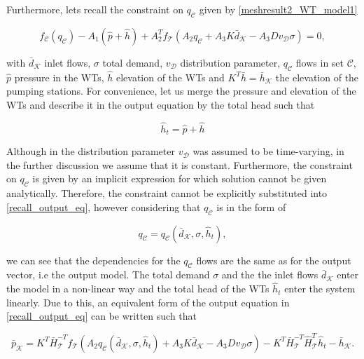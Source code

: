 Furthermore, lets recall the constraint on $q_\mathcal{C}$ given by \eqref{meshresult2_WT_model1}

 \begin{equation}
\label{recall_constraint eq}
f_{\mathcal{C}}(q_\mathcal{C}) - A_1(\hat{p} + \hat{h}) + A_2^T f_{\mathcal{T}}(A_2 q_\mathcal{C} + A_3 K \bar{d}_{\mathcal{K}} - A_3 D v_{\mathcal{D}} \sigma) = 0,
\end{equation} 

with $\bar{d}_{\mathcal{K}}$ inlet flows, $\sigma$ total demand, $v_{\mathcal{D}}$ distribution parameter, $q_\mathcal{C}$ flows in set $\mathcal{C}$, $\hat{p}$ pressure in the WTs, $\hat{h}$ elevation of the WTs and $K^T\bar{h} = \bar{h}_{\mathcal{K}} $ the elevation of the pumping stations. For convenience, let us merge the pressure and elevation of the WTs and describe it in the output equation by the total head such that

 \begin{equation}
\label{totalhead_output_eq}
\hat{h}_t = \hat{p} + \hat{h}
\end{equation} 

Although in  the distribution parameter $v_{\mathcal{D}}$ was assumed to be time-varying, in the further discussion we assume that it is constant. Furthermore, the constraint on $q_\mathcal{C}$ is given by an implicit expression for which solution cannot be given analytically. Therefore, the constraint cannot be explicitly substituted into \eqref{recall_output_eq}, however considering that $q_\mathcal{C}$ is in the form of

 \begin{equation}
\label{qc_abstraction}
q_\mathcal{C} = q_\mathcal{C}(\bar{d}_{\mathcal{K}}, \sigma, \hat{h}_t ),
\end{equation} 

we can see that the dependencies for the $q_\mathcal{C}$ flows are the same as for the output vector, i.e the output model. The total demand $\sigma$ and the the inlet flows $\bar{d}_{\mathcal{K}}$ enter the model in a non-linear way and the total head of the WTs $\hat{h}_t$ enter the system linearly. Due to this, an equivalent form of the output equation in \eqref{recall_output_eq} can be written such that

 \begin{equation}
  \label{recall_output_eq_2}
  \bar{p}_{\mathcal{K}} = K^T \bar{H}^{-T}_{\mathcal{T}}f_{\mathcal{T}}(A_2 q_\mathcal{C}(\bar{d}_{\mathcal{K}}, \sigma, \hat{h}_t ) + A_3 K \bar{d}_{\mathcal{K}} - A_3 D v_{\mathcal{D}} \sigma) - K^T\bar{H}^{-T}_{\mathcal{T}}\hat{H}^{T}_{\mathcal{T}} \hat{h}_t - \bar{h}_{\mathcal{K}}. 
\end{equation} 

